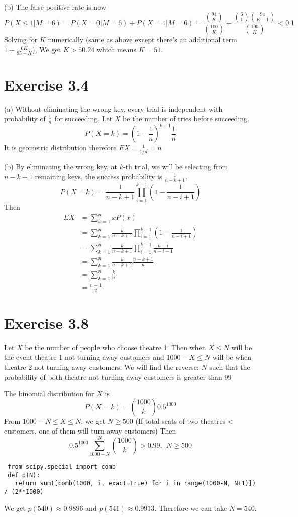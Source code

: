 \documentclass[12pt]{article}
\begin{document}
(b)
The false positive rate is now 
$$P(X\leq 1 | M = 6) = P(X=0|M=6) + P(X=1|M=6)=  \frac{{94 \choose K}}{{100 \choose K}} +  \frac{{6 \choose 1}{94 \choose K-1}}{{100 \choose K}} < 0.1 $$
Solving for $K$ numerically (same as above except there's an additional term $1 + \frac{6K}{95-K}$), We get $K > 50.24$ which means $K=51$.

\section*{Exercise 3.4}
(a) Without eliminating the wrong key, every trial is independent with probability of $\frac{1}{n}$ for succeeding. Let $X$ be the number of tries before succeeding. 
$$P(X=k) = \left(1 - \frac{1}{n}\right)^{k-1} \frac{1}{n}$$
It is geometric distribution therefore $EX = \frac{1}{1/n} = n$

(b) By eliminating the wrong key, at $k$-th trial, we will be selecting from $n - k + 1$ remaining keys, the success probability is $\frac{1}{n-k+1}$. 
$$P(X=k) = \frac{1}{n-k+1} \prod^{k-1}_{i=1} \left(1- \frac{1}{n-i+1} \right)$$
Then
$$\begin{aligned}
EX &= \sum_{x=1}^{n} xP(x) \\
   &= \sum_{k=1}^{n} \frac{k}{n-k+1} \prod^{k-1}_{i=1} \left(1- \frac{1}{n-i+1} \right) \\
   &= \sum_{k=1}^{n} \frac{k}{n-k+1} \prod^{k-1}_{i=1} \frac{n -i}{n-i+1} \\
   &= \sum_{k=1}^{n} \frac{k}{n-k+1} \frac{n - k + 1}{n} \\
   &= \sum_{k=1}^{n} \frac{k}{n} \\
   &= \frac{n+1}{2}
\end{aligned}$$

\section*{Exercise 3.8}
Let $X$ be the number of people who choose theatre 1. Then when $X \leq N$ will be the event theatre 1 not turning away customers and $1000 - X \leq N$ will be when theatre 2 not turning away customers.
We will find the reverse: $N$ such that the probability of both theatre not turning away customers is greater than 99%

The binomial distribution for $X$ is $$ P(X = k) = {1000 \choose k} 0.5^{1000}$$
From $1000 -N \leq X \leq N$, we get $N \geq 500$ (If total seats of two theatres < customers, one of them will turn away customers)
Then
$$ 0.5^{1000} \sum^{N}_{1000-N} {1000 \choose k} > 0.99, \ \ N \geq 500$$
\begin{lstlisting}
 from scipy.special import comb
 def p(N):
   return sum([comb(1000, i, exact=True) for i in range(1000-N, N+1)]) / (2**1000)
\end{lstlisting}
We get $p(540) \approx 0.9896$ and $p(541) \approx 0.9913$. Therefore we can take $N = 540$.
\end{document}
